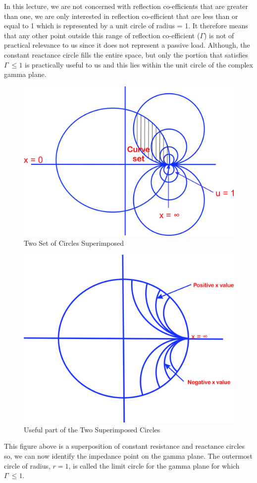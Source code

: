 In this lecture, we are not concerned with reflection co-efficients that are greater than one, we are only interested in reflection co-efficient that are less than or equal to 1 which is represented by a unit circle of radius = 1. It therefore means that any other point outside this range of reflection co-efficient ($\Gamma$) is not of practical relevance to us since it does not represent a passive load.  Although, the constant reactance circle fills the entire space, but only the portion that satisfies $ \Gamma\ \leq 1$ is practically useful to us and this lies within the unit circle of the complex gamma plane.
\begin{figure}[h]
\centering
\includegraphics[width=0.5\linewidth]{./graphics/ijnbvcxw}
\caption{Two Set of Circles Superimposed}
\label{fig:ijnbvcxw}
\end{figure}
\begin{figure}[h]
\centering
\includegraphics[width=0.5\linewidth]{./graphics/sddfghj}
\caption{Useful part of the Two Superimposed Circles}
\label{fig:sddfghj}
\end{figure}

This figure above is a superposition of constant resistance and reactance circles so, we can now identify the impedance point on the gamma plane.  The outermost circle of radius, $r= 1$, is called the limit circle for the gamma plane for which $\Gamma\ \leq 1$.\\

